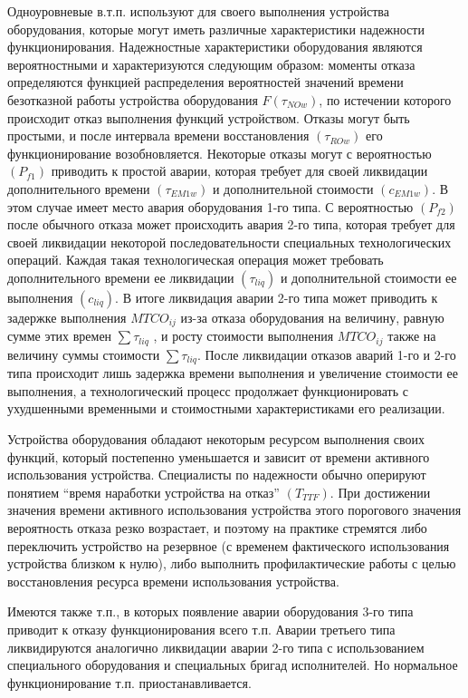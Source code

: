 Одноуровневые в.т.п. используют для своего выполнения устройства оборудования, которые могут иметь различные характеристики надежности функционирования.
Надежностные характеристики оборудования являются вероятностными и характеризуются следующим образом: моменты отказа определяются функцией распределения вероятностей значений времени безотказной работы устройства оборудования $F( \tau _{NOw})$, по истечении которого происходит отказ выполнения функций устройством. Отказы могут быть простыми, и после интервала времени восстановления $(\tau _{ROw})$ его функционирование возобновляется. Некоторые отказы могут с вероятностью $( P_{f1})$ приводить к простой аварии, которая требует для своей ликвидации дополнительного времени $( \tau _{EM1w})$ и дополнительной стоимости $( c _{EM1w})$. В этом случае имеет место авария оборудования 1-го типа. С вероятностью $( P_{f2})$ после обычного отказа может происходить авария 2-го типа, которая требует для своей ликвидации некоторой последовательности специальных технологических операций. Каждая такая технологическая операция может требовать дополнительного времени ее ликвидации $( \tau _{liq})$ и дополнительной стоимости ее выполнения $( c_{liq})$. В итоге ликвидация аварии 2-го типа может приводить к задержке выполнения $MTCO_{ij}$ из-за отказа оборудования на величину, равную сумме этих времен $\sum\tau_{liq}$ , и росту стоимости выполнения $MTCO_{ij}$ также на величину суммы стоимости $\sum\tau_{liq}$. После ликвидации отказов аварий 1-го и 2-го типа происходит лишь задержка времени выполнения и увеличение стоимости ее выполнения, а технологический процесс продолжает функционировать с ухудшенными временными и стоимостными характеристиками его реализации.

Устройства оборудования обладают некоторым ресурсом выполнения своих функций, который постепенно уменьшается и зависит от времени активного использования устройства. Специалисты по надежности обычно оперируют понятием ``время наработки устройства на отказ'' $(T_{TTF})$. При достижении значения времени активного использования устройства этого порогового значения вероятность отказа резко возрастает, и поэтому на практике стремятся либо переключить устройство на резервное (с временем фактического использования устройства близком к нулю), либо выполнить профилактические работы с целью восстановления ресурса времени использования устройства.

Имеются также т.п., в которых появление аварии оборудования 3-го типа приводит к отказу функционирования всего т.п. Аварии третьего типа ликвидируются аналогично ликвидации аварии 2-го типа с использованием специального оборудования и специальных бригад исполнителей. Но нормальное функционирование т.п. приостанавливается.


